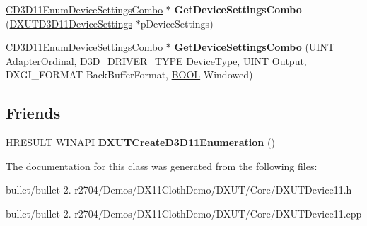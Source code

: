 \begin{DoxyCompactItemize}
\item 
\hypertarget{class_c_d3_d11_enumeration_a40677a66e15123f2d201f0b3e963fcbd}{\hyperlink{struct_c_d3_d11_enum_device_settings_combo}{C\+D3\+D11\+Enum\+Device\+Settings\+Combo} $\ast$ {\bfseries Get\+Device\+Settings\+Combo} (\hyperlink{struct_d_x_u_t_d3_d11_device_settings}{D\+X\+U\+T\+D3\+D11\+Device\+Settings} $\ast$p\+Device\+Settings)}\label{class_c_d3_d11_enumeration_a40677a66e15123f2d201f0b3e963fcbd}

\item 
\hypertarget{class_c_d3_d11_enumeration_adab5f9aa308a0fe551519f321093b9b2}{\hyperlink{struct_c_d3_d11_enum_device_settings_combo}{C\+D3\+D11\+Enum\+Device\+Settings\+Combo} $\ast$ {\bfseries Get\+Device\+Settings\+Combo} (U\+I\+N\+T Adapter\+Ordinal, D3\+D\+\_\+\+D\+R\+I\+V\+E\+R\+\_\+\+T\+Y\+P\+E Device\+Type, U\+I\+N\+T Output, D\+X\+G\+I\+\_\+\+F\+O\+R\+M\+A\+T Back\+Buffer\+Format, \hyperlink{_ice_types_8h_a050c65e107f0c828f856a231f4b4e788}{B\+O\+O\+L} Windowed)}\label{class_c_d3_d11_enumeration_adab5f9aa308a0fe551519f321093b9b2}

\end{DoxyCompactItemize}
\subsection*{Friends}
\begin{DoxyCompactItemize}
\item 
\hypertarget{class_c_d3_d11_enumeration_a9c9d9696a800bc55509613d15350d801}{H\+R\+E\+S\+U\+L\+T W\+I\+N\+A\+P\+I {\bfseries D\+X\+U\+T\+Create\+D3\+D11\+Enumeration} ()}\label{class_c_d3_d11_enumeration_a9c9d9696a800bc55509613d15350d801}

\end{DoxyCompactItemize}


The documentation for this class was generated from the following files\+:\begin{DoxyCompactItemize}
\item 
bullet/bullet-\/2.-\/r2704/\+Demos/\+D\+X11\+Cloth\+Demo/\+D\+X\+U\+T/\+Core/D\+X\+U\+T\+Device11.\+h\item 
bullet/bullet-\/2.-\/r2704/\+Demos/\+D\+X11\+Cloth\+Demo/\+D\+X\+U\+T/\+Core/D\+X\+U\+T\+Device11.\+cpp\end{DoxyCompactItemize}
